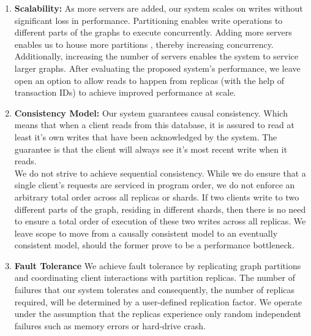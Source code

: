 \documentclass[letterpaper, 11 pt, conference]{ieeeconf}  %
\begin{document}
\begin{enumerate}
	\item \textbf{Scalability: } 
As more servers are added, our system scales on writes without significant loss in performance. Partitioning enables write operations to different parts of the graphs to execute concurrently. Adding more servers enables us to house more partitions , thereby increasing concurrency. Additionally, increasing the number of servers enables the system to service larger graphs. 
After evaluating the proposed system’s performance, we leave open an option to allow reads to happen from replicas (with the help of transaction IDs) to achieve improved performance at scale. \\
	\item \textbf{Consistency Model:} 
Our system guarantees causal consistency. Which means that when a client reads from this database, it is assured to read at least it's own writes that have been acknowledged by the system. The guarantee is that the client will always see it’s most recent write when it reads.\\
We do not strive to achieve sequential consistency. While we do ensure that a single client’s requests are serviced in program order, we do not enforce an arbitrary total order across all replicas or shards. If two clients write to two different parts of the graph, residing in different shards, then there is no need to  ensure a total order of execution of these two writes across all replicas. We leave scope to move from a causally consistent model to an eventually consistent model, should the former prove to be a performance bottleneck. \\
	\item \textbf{Fault Tolerance}
    We achieve fault tolerance by replicating graph partitions and coordinating client interactions with partition replicas. The number of failures that our system tolerates and consequently, the number of replicas required, will be determined by a user-defined replication factor. We operate under the assumption that the replicas experience only random independent failures such as memory errors or hard-drive crash.\\
    

\end{enumerate}
\end{document}
